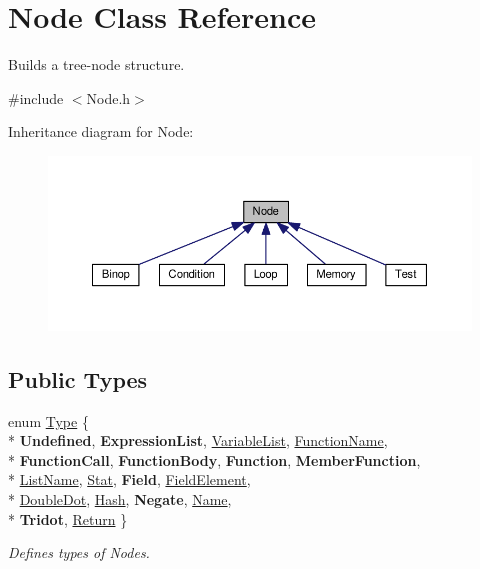 \hypertarget{classNode}{}\section{Node Class Reference}
\label{classNode}


Builds a tree-\/node structure.  




{\ttfamily \#include $<$Node.\+h$>$}



Inheritance diagram for Node\+:\nopagebreak
\begin{figure}[H]
\begin{center}
\leavevmode
\includegraphics[width=350pt]{classNode__inherit__graph}
\end{center}
\end{figure}
\subsection*{Public Types}
\begin{DoxyCompactItemize}
\item 
enum \hyperlink{classNode_a8dad370be1595f49e0a7c2406a91e867}{Type} \{ \\*
{\bfseries Undefined}, 
{\bfseries Expression\+List}, 
\hyperlink{classNode_a8dad370be1595f49e0a7c2406a91e867a8fb6b35a2762acd63c8d42fc8575889e}{Variable\+List}, 
\hyperlink{classNode_a8dad370be1595f49e0a7c2406a91e867a496a823a62742a6ebb9f4fb757e02ce4}{Function\+Name}, 
\\*
{\bfseries Function\+Call}, 
{\bfseries Function\+Body}, 
{\bfseries Function}, 
{\bfseries Member\+Function}, 
\\*
\hyperlink{classNode_a8dad370be1595f49e0a7c2406a91e867a1a3ec9cbafad290cdd86122121b61391}{List\+Name}, 
\hyperlink{classNode_a8dad370be1595f49e0a7c2406a91e867a82f82cd405ee2ded93d8f9133e2f5f34}{Stat}, 
{\bfseries Field}, 
\hyperlink{classNode_a8dad370be1595f49e0a7c2406a91e867a12f1dc625982c23638509a4039543b59}{Field\+Element}, 
\\*
\hyperlink{classNode_a8dad370be1595f49e0a7c2406a91e867a9b98ce84dc5f406e0743acc13f03aaf6}{Double\+Dot}, 
\hyperlink{classNode_a8dad370be1595f49e0a7c2406a91e867ad05e3fa202cceccd870b5aac8467623c}{Hash}, 
{\bfseries Negate}, 
\hyperlink{classNode_a8dad370be1595f49e0a7c2406a91e867a183ed1e4cc2be1e5df44762c452281ef}{Name}, 
\\*
{\bfseries Tridot}, 
\hyperlink{classNode_a8dad370be1595f49e0a7c2406a91e867aab13754f7d035f904f4fc861bc6ad211}{Return}
 \}
\begin{DoxyCompactList}\small\item\em Defines types of Nodes. \end{DoxyCompactList}\end{DoxyCompactItemize}

